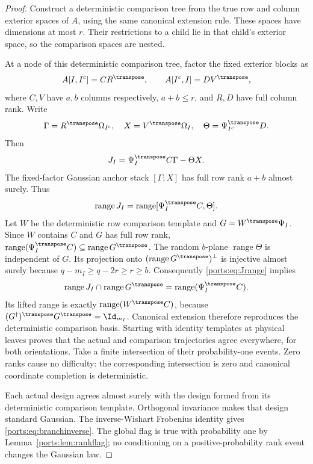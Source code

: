 \documentclass[11pt,oneside,openany,a4paper]{book}
\numberwithin{equation}{chapter}
\theoremstyle{definition}
\theoremstyle{remark}
\DeclareMathOperator{\ran}{range}\DeclareMathOperator{\OPT}{OPT}
\begin{document}
\begin{proof}
Construct a deterministic comparison tree from the true row and column exterior spaces of $A$, using the same canonical extension rule. These spaces have dimensions at most $r$. Their restrictions to a child lie in that child's exterior space, so the comparison spaces are nested.

At a node of this deterministic comparison tree, factor the fixed exterior blocks as
\[
 A[I,I^c]=CR^\transpose,\qquad A[I^c,I]=DV^\transpose,
\]
where $C,V$ have $a,b$ columns respectively, $a+b\le r$, and $R,D$ have full column rank. Write
\[
 \Gamma=R^\transpose\Omega_{I^c},\quad
 X=V^\transpose\Omega_I,\quad\Theta=\Psi_{I^c}^\transpose D.
\]
Then
\[
 J_I=\Psi_I^\transpose C\Gamma-\Theta X.
\]
The fixed-factor Gaussian anchor stack $[\Gamma;X]$ has full row rank $a+b$ almost surely. Thus
\begin{equation}\label{ports:eq:Jrange}
 \ran J_I=\ran[\Psi_I^\transpose C,\Theta].
\end{equation}
Let $W$ be the deterministic row comparison template and $G=W^\transpose\Psi_I$. Since $W$ contains $C$ and $G$ has full row rank,
$\ran(\Psi_I^\transpose C)\subseteq\ran G^\transpose$.
The random $b$-plane $\ran\Theta$ is independent of $G$. Its projection onto $(\ran G^\transpose)^\perp$ is injective almost surely because
$q-m_I\ge q-2r\ge r\ge b$.
Consequently \eqref{ports:eq:Jrange} implies
\[
 \ran J_I\cap\ran G^\transpose=\ran(\Psi_I^\transpose C).
\]
Its lifted range is exactly $\ran(W^\transpose C)$, because
$(G^\dagger)^\transpose G^\transpose=\Id_{m_I}$.
Canonical extension therefore reproduces the deterministic comparison basis. Starting with identity templates at physical leaves proves that the actual and comparison trajectories agree everywhere, for both orientations. Take a finite intersection of their probability-one events. Zero ranks cause no difficulty: the corresponding intersection is zero and canonical coordinate completion is deterministic.

Each actual design agrees almost surely with the design formed from its deterministic comparison template. Orthogonal invariance makes that design standard Gaussian. The inverse-Wishart Frobenius identity gives \eqref{ports:eq:branchinverse}. The global flag is true with probability one by Lemma~\ref{ports:lem:rankflag}; no conditioning on a positive-probability rank event changes the Gaussian law.
\end{proof}
\end{document}

